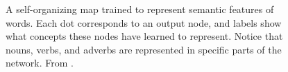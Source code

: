 \begin{figure}[h]
\centering
{}
\caption[From Kohonen, 1990 \cite{kohonen1990self}.]{A self-organizing map trained to represent semantic features of words. Each dot corresponds to an output node, and labels show what concepts these nodes have learned to represent. Notice that nouns, verbs, and adverbs are represented in specific parts of the network. From \cite[p.~1476]{kohonen1990self}.}
\label{somSemantic}
\end{figure}
